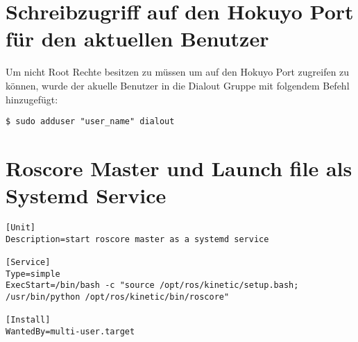 \section{Schreibzugriff auf den Hokuyo Port für den aktuellen Benutzer}
Um nicht Root Rechte besitzen zu müssen um auf den Hokuyo Port zugreifen zu können, wurde der akuelle Benutzer in die Dialout Gruppe mit folgendem Befehl hinzugefügt:

\begin{lstlisting}
$ sudo adduser "user_name" dialout
\end{lstlisting}

\section{Roscore Master und Launch file als Systemd Service}


\begin{lstlisting}
[Unit]
Description=start roscore master as a systemd service

[Service]
Type=simple
ExecStart=/bin/bash -c "source /opt/ros/kinetic/setup.bash; /usr/bin/python /opt/ros/kinetic/bin/roscore"

[Install]
WantedBy=multi-user.target
\end{lstlisting}

